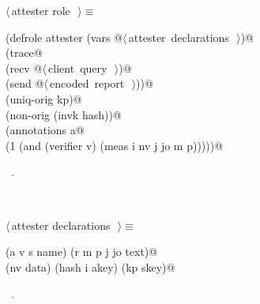 \documentclass[titlepage,12pt]{article}
\theoremstyle{definition}
\begin{document}
\begin{flushleft} \small
\begin{minipage}{\linewidth} \label{scrap21}
$\langle\,$attester role\nobreak\ {\footnotesize {}}$\,\rangle\equiv$
\vspace{-1ex}
\begin{list}{}{} \item
\mbox{}\verb@(defrole attester (vars @\hbox{$\langle\,$attester declarations\nobreak\ {\footnotesize {}}$\,\rangle$}\verb@)@\\
\mbox{}\verb@  (trace@\\
\mbox{}\verb@    (recv @\hbox{$\langle\,$client query\nobreak\ {\footnotesize {}}$\,\rangle$}\verb@)@\\
\mbox{}\verb@    (send @\hbox{$\langle\,$encoded report\nobreak\ {\footnotesize {}}$\,\rangle$}\verb@))@\\
\mbox{}\verb@  (uniq-orig kp)@\\
\mbox{}\verb@  (non-orig (invk hash))@\\
\mbox{}\verb@  (annotations a@\\
\mbox{}\verb@    (1 (and (verifier v) (meas i nv j jo m p)))))@{\NWsep}
\end{list}
\vspace{-1ex}
\footnotesize\addtolength{\baselineskip}{-1ex}
\begin{list}{}{\setlength{\itemsep}{-\parsep}\setlength{\itemindent}{-\leftmargin}}
\item \NWtxtMacroRefIn\ .
\end{list}
\end{minipage}\\[4ex]
\end{flushleft}
\begin{flushleft} \small
\begin{minipage}{\linewidth} \label{scrap22}
$\langle\,$attester declarations\nobreak\ {\footnotesize {}}$\,\rangle\equiv$
\vspace{-1ex}
\begin{list}{}{} \item
\mbox{}\verb@(a v s name) (r m p j jo text)@\\
\mbox{}\verb@(nv data) (hash i akey) (kp skey)@{\NWsep}
\end{list}
\vspace{-1ex}
\footnotesize\addtolength{\baselineskip}{-1ex}
\begin{list}{}{\setlength{\itemsep}{-\parsep}\setlength{\itemindent}{-\leftmargin}}
\item \NWtxtMacroRefIn\ .
\end{list}
\end{minipage}\\[4ex]
\end{flushleft}
\end{document}
